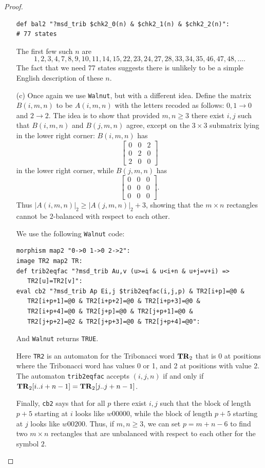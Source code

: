 \documentclass[final]{dmtcs-episciences}
\theoremstyle{plain}
\theoremstyle{remark}
\begin{document}
\begin{proof}
\begin{itemize}
\begin{verbatim}
def bal2 "?msd_trib $chk2_0(n) & $chk2_1(n) & $chk2_2(n)":
# 77 states    
\end{verbatim}
The first few such $n$ are
$$ 1, 2, 3, 4, 7, 8, 9, 10, 11, 14, 15, 22, 23, 24, 27, 28, 33, 34, 35, 46, 47, 48, \ldots . $$
The fact that we need 77 states suggests there is unlikely to be a simple English description of these $n$.

\item[(c)]  Once again we use {\tt Walnut}, but with a different idea.  Define
the matrix $B(i,m,n)$ to be $A(i,m,n)$ with the letters
recoded as follows:  $0, 1 \rightarrow 0$ and $2 \rightarrow 2$.
The idea is to show that provided $m, n \geq 3$ there exist $i,j$
such that $B(i,m,n)$ and $B(j,m,n)$ agree, except on the $3 \times 3$ submatrix lying in the lower right corner:  $B(i,m,n)$ has
$$ \left[ \begin{matrix}
0 & 0 & 2 \\
0 & 2 & 0 \\
2 & 0 & 0
\end{matrix} \right]$$
in the lower right corner, while
$B(j,m,n)$ has
$$ \left[ \begin{matrix}
0 & 0 & 0 \\
0 & 0 & 0 \\
0 & 0 & 0
\end{matrix}\right] .$$
Thus $|A(i,m,n)|_2 \geq |A(j,m,n)|_2 + 3$, showing that
the $m \times n$ rectangles cannot be $2$-balanced with respect to each other.

We use the following {\tt Walnut} code:
\begin{verbatim}
morphism map2 "0->0 1->0 2->2":
image TR2 map2 TR:
def trib2eqfac "?msd_trib Au,v (u>=i & u<i+n & u+j=v+i) =>
   TR2[u]=TR2[v]":
eval cb2 "?msd_trib Ap Ei,j $trib2eqfac(i,j,p) & TR2[i+p]=@0 & 
   TR2[i+p+1]=@0 & TR2[i+p+2]=@0 & TR2[i+p+3]=@0 & 
   TR2[i+p+4]=@0 & TR2[j+p]=@0 & TR2[j+p+1]=@0 & 
   TR2[j+p+2]=@2 & TR2[j+p+3]=@0 & TR2[j+p+4]=@0":
\end{verbatim}
And {\tt Walnut} returns {\tt TRUE}.

Here {\tt TR2} is an automaton for the Tribonacci word ${\bf TR}_2$ that is 0 at positions where the Tribonacci word has values 0 or 1, and 2 at positions with value 2.
The automaton {\tt trib2eqfac} accepts $(i,j,n)$ if and only if ${\bf TR}_2[i..i+n-1]={\bf TR}_2[j..j+n-1]$.

Finally, {\tt cb2} says that for all $p$ there exist $i, j$
such that the block of length $p+5$ starting at $i$ looks like $w00000$, while
the block of length $p+5$ starting at $j$ looks like $w00200$.
Thus, if $m, n \geq 3$, we can set $p = m+n-6$ to find two $m \times n$ rectangles that are unbalanced with respect to each other for the symbol $2$. \vspace{-1.7\baselineskip}
\end{itemize}
\end{proof}
\end{document}
